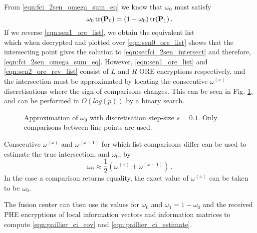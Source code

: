 \documentclass[letterpaper, 10 pt, conference]{ieeeconf}  %
\begin{document}
From \eqref{eqn:fci_2sen_omega_sum_eq} we know that $\omega_0$ must satisfy
\begin{equation}
   \omega_0 \operatorname{tr}({{\mathbf{P}}}_0) = (1-\omega_0)\operatorname{tr}({{\mathbf{P}}}_1)\,. \label{eqn:secfci_2sen_intersect}
\end{equation}
If we reverse \eqref{eqn:sen1_ore_list}, we obtain the equivalent list
\begin{equation}
   [\mathcal{E}^R_{ORE}((1-\omega^{(0)})\tr(\mP_1)),\dots,\mathcal{E}^L_{ORE}((1-\omega^{(p)})\tr(\mP_1))] \label{eqn:sen2_ore_rev_list}
\end{equation}
which when decrypted and plotted over \eqref{eqn:sen0_ore_list} shows that the intersecting point gives the solution to \eqref{eqn:secfci_2sen_intersect} and therefore, \eqref{eqn:fci_2sen_omega_sum_eq}. However, \eqref{eqn:sen1_ore_list} and \eqref{eqn:sen2_ore_rev_list} consist of $L$ and $R$ ORE encryptions respectively, and the intersection must be approximated by locating the consecutive $\omega^{(x)}$ discretisations where the sign of comparisons changes. This can be seen in Fig. \ref{fig:2_sensor_sol}, and can be performed in $O(log(p))$ by a binary search.
\begin{figure}[tb]
   \vspace{-5pt}
   \begin{center}
      
   \end{center}
   \vspace{-10pt}
   \caption{Approximation of $\omega_0$ with discretisation step-size $s=0.1$. Only comparisons between line points are used.}
   \vspace{-\baselineskip}
   \label{fig:2_sensor_sol}
\end{figure}
Consecutive $\omega^{(x)}$ and $\omega^{(x+1)}$ for which list comparisons differ can be used to estimate the true intersection, and $\omega_0$, by
\begin{equation}
   \omega_0 \approx \frac{1}{2}(\omega^{(x)} + \omega^{(x+1)})\,. \label{eqn:secfci_2sen_omega}
\end{equation}
In the case a comparison returns equality, the exact value of $\omega^{(x)}$ can be taken to be $\omega_0$.

The fusion center can then use its values for $\omega_0$ and $\omega_1 = 1-\omega_0$ and the received PHE encryptions of local information vectors and information matrices to compute \eqref{eqn:paillier_ci_cov} and \eqref{eqn:paillier_ci_estimate}.

\end{document}
